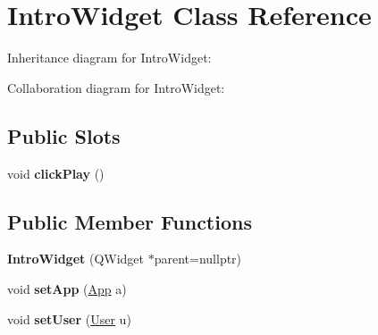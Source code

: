 \hypertarget{classIntroWidget}{}\section{Intro\+Widget Class Reference}
\label{classIntroWidget}


Inheritance diagram for Intro\+Widget\+:


Collaboration diagram for Intro\+Widget\+:
\subsection*{Public Slots}
\begin{DoxyCompactItemize}
\item 
\mbox{\label{classIntroWidget_a61b2c8d7931311e5a1fecb3dbe83b46b}} 
void {\bfseries click\+Play} ()
\end{DoxyCompactItemize}
\subsection*{Public Member Functions}
\begin{DoxyCompactItemize}
\item 
\mbox{\label{classIntroWidget_ab277695dd0d142366b8dd07eaca86b90}} 
{\bfseries Intro\+Widget} (Q\+Widget $\ast$parent=nullptr)
\item 
\mbox{\label{classIntroWidget_adbcb12ef241306cb71c02d8df7cb302e}} 
void {\bfseries set\+App} (\hyperlink{classApp}{App} a)
\item 
\mbox{\label{classIntroWidget_abe07c01b827ee0f291ea395a0a4b838a}} 
void {\bfseries set\+User} (\hyperlink{classUser}{User} u)
\end{DoxyCompactItemize}
